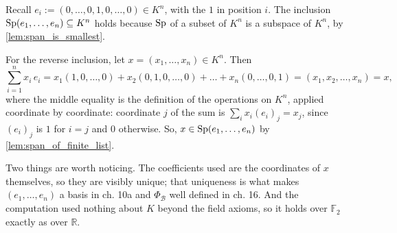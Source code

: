 \begin{exercisesolution}
\label{sol:check_standard_span}
Recall $e_i := (0, \dots, 0, 1, 0, \dots, 0) \in K^n$, with the $1$ in position $i$. The inclusion $\operatorname{Sp}(e_1, \dots, e_n) \subseteq K^n$ holds because $\operatorname{Sp}$ of a subset of $K^n$ is a subspace of $K^n$, by \cref{lem:span_is_smallest}.

For the reverse inclusion, let $x = (x_1, \dots, x_n) \in K^n$. Then
\[
    \sum_{i=1}^{n} x_i \, e_i
    = x_1 (1, 0, \dots, 0) + x_2 (0, 1, 0, \dots, 0) + \dots + x_n (0, \dots, 0, 1)
    = (x_1, x_2, \dots, x_n) = x,
\]
where the middle equality is the definition of the operations on $K^n$, applied coordinate by coordinate: coordinate $j$ of the sum is $\sum_i x_i (e_i)_j = x_j$, since $(e_i)_j$ is $1$ for $i = j$ and $0$ otherwise. So, $x \in \operatorname{Sp}(e_1, \dots, e_n)$ by \cref{lem:span_of_finite_list}.

Two things are worth noticing. The coefficients used are the coordinates of $x$ themselves, so they are visibly unique; that uniqueness is what makes $(e_1, \dots, e_n)$ a basis in ch. 10a and $\Phi_{\mathcal{B}}$ well defined in ch. 16. And the computation used nothing about $K$ beyond the field axioms, so it holds over $\mathbb{F}_2$ exactly as over $\mathbb{R}$.
\end{exercisesolution}

